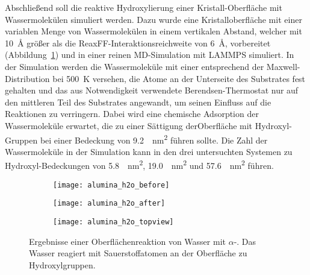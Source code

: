 Abschließend soll die reaktive Hydroxylierung einer Kristall-Oberfläche mit Wassermolekülen simuliert werden.
Dazu wurde eine Kristalloberfläche mit einer variablen Menge von Wassermolekülen in einem vertikalen Abstand, welcher mit \SI{10}{\angstrom} größer als die ReaxFF-Inter\-aktions\-reich\-weite von \SI{6}{\angstrom}, vorbereitet (Abbildung~\ref{fig:wateraluminasurface-a}) und in einer reinen MD-Simulation mit LAMMPS simuliert.
In der Simulation werden die Wassermoleküle mit einer entsprechend der Maxwell-Distribution bei \SI{500}{\kelvin} versehen, die Atome an der Unterseite des Substrates fest gehalten und das aus Notwendigkeit verwendete Berendsen-Thermostat nur auf den mittleren Teil des Substrates angewandt, um seinen Einfluss auf die Reaktionen zu verringern.
Dabei wird eine chemische Adsorption der Wassermoleküle erwartet\cite{shapovalov_ab_2000}, die zu einer Sättigung derOberfläche mit Hydroxyl-Gruppen bei einer Bedeckung von \SI{9.2}{\per\square\nano\meter}\cite{kim_energy_2011} führen sollte.
Die Zahl der Wassermoleküle in der Simulation kann in den drei untersuchten Systemen zu Hydroxyl-Bedeckungen von \SI{5.8}{\per\square\nano\meter}, \SI{19.0}{\per\square\nano\meter} und \SI{57.6}{\per\square\nano\meter} führen.
\begin{figure}
  \captionsetup[subfigure]{singlelinecheck=false}
  \def\subfigwidth{0.32\textwidth}
  \begin{subfigure}[t]{\subfigwidth}
    \texttt{[image: alumina\_h2o\_before]}
    \label{fig:wateraluminasurface-a}
  \end{subfigure}
  \hfill
  \begin{subfigure}[t]{\subfigwidth}
    \texttt{[image: alumina\_h2o\_after]}
    \label{fig:wateraluminasurface-b}
  \end{subfigure}
  \hfill
  \begin{subfigure}[t]{\subfigwidth}
    \texttt{[image: alumina\_h2o\_topview]}
    \label{fig:wateraluminasurface-c}
  \end{subfigure}
  \caption[Oberflächenreaktion von Wasser mit $\alpha$-]{Ergebnisse einer Oberflächenreaktion von Wasser mit $\alpha$-.
    Das Wasser reagiert mit Sauerstoffatomen an der Oberfläche zu Hydroxylgruppen.
  }
  \label{fig:wateraluminasurface}
\end{figure}

